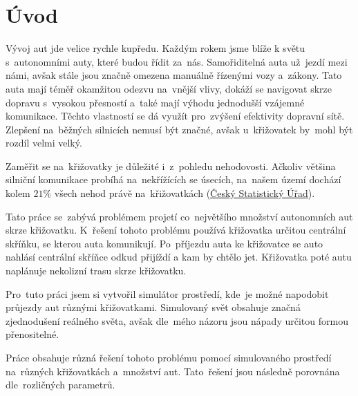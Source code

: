 \chapter*{Úvod}\label{ch:uvod}

Vývoj aut jde velice rychle kupředu.
Každým rokem jsme blíže k světu s~autonomními auty, které budou řídit za~nás.
Samořiditelná auta už~jezdí mezi námi, avšak stále jsou značně omezena manuálně řízenými vozy a~zákony.
Tato auta mají téměř okamžitou odezvu na~vnější vlivy, dokáží se navigovat skrze dopravu s~vysokou přesností
a~také mají výhodu jednodušší vzájemné komunikace.
Těchto vlastností se dá využít pro~zvýšení efektivity dopravní sítě.
Zlepšení na~běžných silnicích nemusí být značné, avšak u~křižovatek by~mohl být rozdíl velmi velký.

Zaměřit se na~křižovatky je důležité i~z~pohledu nehodovosti.
Ačkoliv většina silniční komunikace probíhá na~nekřížících se úsecích, na~našem území dochází kolem $21\%$ všech nehod
právě na~křižovatkách (\href{https://www.czso.cz/documents/10180/20534694/32025414a06.pdf}{Český Statistický Úřad}).

Tato práce se~zabývá problémem projetí co~největšího množství autonomních aut skrze křižovatku.
K~řešení tohoto problému používá křižovatka určitou centrální skříňku, se kterou auta komunikují.
Po~příjezdu auta ke křižovatce se auto nahlásí centrální skříňce odkud přijíždí a kam by chtělo jet.
Křižovatka poté autu naplánuje nekolizní trasu skrze křižovatku.

Pro~tuto práci jsem si vytvořil simulátor prostředí, kde~je možné napodobit průjezdy aut různými křižovatkami.
Simulovaný svět obsahuje značná zjednodušení reálného světa, avšak dle~mého názoru jsou nápady určitou formou přenositelné.

Práce obsahuje různá řešení tohoto problému pomocí simulovaného prostředí na~různých křižovatkách a~množství aut.
Tato~řešení jsou následně porovnána dle~rozličných parametrů.
